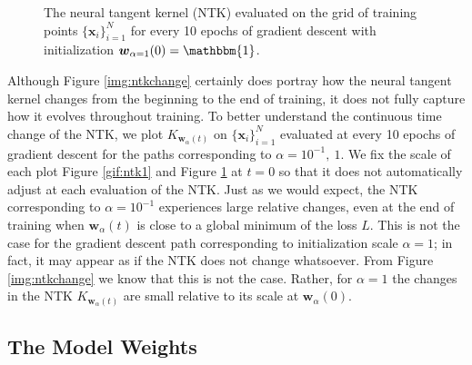 \documentclass{article}
\begin{document}
\begin{figure}[H]
\caption{The neural tangent kernel (NTK) evaluated on the grid of training points $\{ \boldsymbol{x}_i \}_{i=1}^N$ for every 10 epochs of gradient descent with initialization $\boldsymbol{w}_{\alpha = 1}(0) = \mathbbm{1}$.}\label{gif:ntk2}
\end{figure}

Although Figure \ref{img:ntkchange} certainly does portray how the neural tangent kernel changes from the beginning to the end of training, it does not fully capture how it evolves throughout training. To better understand the continuous time change of the NTK, we plot $K_{\boldsymbol{w}_{\alpha}(t)}$ on $\{ \boldsymbol{x}_i \}_{i=1}^N$ evaluated at every 10 epochs of gradient descent for the paths corresponding to $\alpha = 10^{-1}, \ 1$. We fix the scale of each plot Figure \ref{gif:ntk1} and Figure \ref{gif:ntk2} at $t = 0$ so that it does not automatically adjust at each evaluation of the NTK. Just as we would expect, the NTK corresponding to $\alpha = 10^{-1}$ experiences large relative changes, even at the end of training when $\boldsymbol{w}_{\alpha}(t)$ is close to a global minimum of the loss $L$. This is not the case for the gradient descent path corresponding to initialization scale $\alpha = 1$; in fact, it may appear as if the NTK does not change whatsoever. From Figure \ref{img:ntkchange} we know that this is not the case. Rather, for $\alpha = 1$ the changes in the NTK $K_{\boldsymbol{w}_{\alpha}(t)}$ are small relative to its scale at $\boldsymbol{w}_{\alpha}(0)$.

\subsection{The Model Weights}
\end{document}

